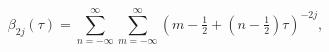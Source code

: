 \[\beta_{2j}(\tau)=\sum_{n=-\infty}^{\infty}\sum_{m=-\infty}^{\infty}(m-\tfrac{1%
}{2}+(n-\tfrac{1}{2})\tau)^{-2j},\]
